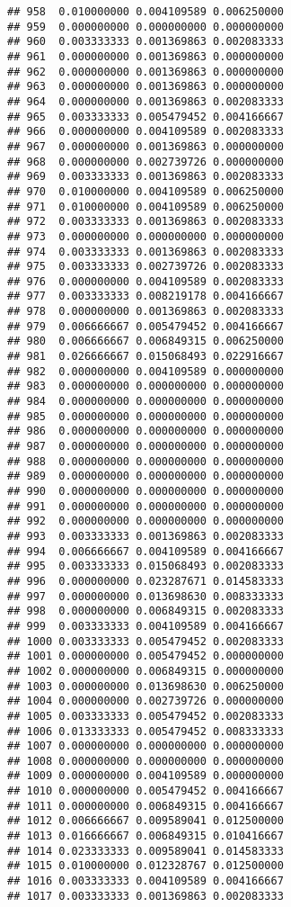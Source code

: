\documentclass[
]{article}
\begin{document}
\begin{verbatim}
## 958  0.010000000 0.004109589 0.006250000
## 959  0.000000000 0.000000000 0.000000000
## 960  0.003333333 0.001369863 0.002083333
## 961  0.000000000 0.001369863 0.000000000
## 962  0.000000000 0.001369863 0.000000000
## 963  0.000000000 0.001369863 0.000000000
## 964  0.000000000 0.001369863 0.002083333
## 965  0.003333333 0.005479452 0.004166667
## 966  0.000000000 0.004109589 0.002083333
## 967  0.000000000 0.001369863 0.000000000
## 968  0.000000000 0.002739726 0.000000000
## 969  0.003333333 0.001369863 0.002083333
## 970  0.010000000 0.004109589 0.006250000
## 971  0.010000000 0.004109589 0.006250000
## 972  0.003333333 0.001369863 0.002083333
## 973  0.000000000 0.000000000 0.000000000
## 974  0.003333333 0.001369863 0.002083333
## 975  0.003333333 0.002739726 0.002083333
## 976  0.000000000 0.004109589 0.002083333
## 977  0.003333333 0.008219178 0.004166667
## 978  0.000000000 0.001369863 0.002083333
## 979  0.006666667 0.005479452 0.004166667
## 980  0.006666667 0.006849315 0.006250000
## 981  0.026666667 0.015068493 0.022916667
## 982  0.000000000 0.004109589 0.000000000
## 983  0.000000000 0.000000000 0.000000000
## 984  0.000000000 0.000000000 0.000000000
## 985  0.000000000 0.000000000 0.000000000
## 986  0.000000000 0.000000000 0.000000000
## 987  0.000000000 0.000000000 0.000000000
## 988  0.000000000 0.000000000 0.000000000
## 989  0.000000000 0.000000000 0.000000000
## 990  0.000000000 0.000000000 0.000000000
## 991  0.000000000 0.000000000 0.000000000
## 992  0.000000000 0.000000000 0.000000000
## 993  0.003333333 0.001369863 0.002083333
## 994  0.006666667 0.004109589 0.004166667
## 995  0.003333333 0.015068493 0.002083333
## 996  0.000000000 0.023287671 0.014583333
## 997  0.000000000 0.013698630 0.008333333
## 998  0.000000000 0.006849315 0.002083333
## 999  0.003333333 0.004109589 0.004166667
## 1000 0.003333333 0.005479452 0.002083333
## 1001 0.000000000 0.005479452 0.000000000
## 1002 0.000000000 0.006849315 0.000000000
## 1003 0.000000000 0.013698630 0.006250000
## 1004 0.000000000 0.002739726 0.000000000
## 1005 0.003333333 0.005479452 0.002083333
## 1006 0.013333333 0.005479452 0.008333333
## 1007 0.000000000 0.000000000 0.000000000
## 1008 0.000000000 0.000000000 0.000000000
## 1009 0.000000000 0.004109589 0.000000000
## 1010 0.000000000 0.005479452 0.004166667
## 1011 0.000000000 0.006849315 0.004166667
## 1012 0.006666667 0.009589041 0.012500000
## 1013 0.016666667 0.006849315 0.010416667
## 1014 0.023333333 0.009589041 0.014583333
## 1015 0.010000000 0.012328767 0.012500000
## 1016 0.003333333 0.004109589 0.004166667
## 1017 0.003333333 0.001369863 0.002083333

\end{verbatim}
\end{document}
